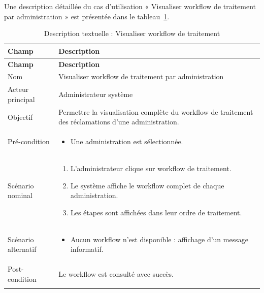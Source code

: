 Une description détaillée du cas d’utilisation « Visualiser workflow de traitement par administration » est présentée dans le tableau~\ref{tab:visualiser-workflow-traitement}.

\renewcommand{\arraystretch}{1.3}

\begin{longtable}{|p{4cm}|p{12cm}|}
\hline
\rowcolor{gray!20}
\textbf{Champ} & \textbf{Description} \\ 
\hline
\endfirsthead

\hline
\rowcolor{gray!20}
\textbf{Champ} & \textbf{Description} \\ 
\hline
\endhead

Nom & Visualiser workflow de traitement par administration \\ \hline

Acteur principal & Administrateur système \\ \hline

Objectif & Permettre la visualisation complète du workflow de traitement des réclamations d’une administration. \\ \hline

Pré-condition &
\begin{itemize}
    \item Une administration est sélectionnée.
\end{itemize}
\\ \hline

Scénario nominal &
\begin{enumerate}
    \item L’administrateur clique sur workflow de traitement.
    \item Le système affiche le workflow complet de chaque administration.
    \item Les étapes sont affichées dans leur ordre de traitement.
\end{enumerate}
\\ \hline

Scénario alternatif &
\begin{itemize}
    \item Aucun workflow n’est disponible : affichage d’un message informatif.
\end{itemize}
\\ \hline

Post-condition &
Le workflow est consulté avec succès. \\ \hline

\caption{Description textuelle : Visualiser workflow de traitement}
\label{tab:visualiser-workflow-traitement}

\end{longtable}


